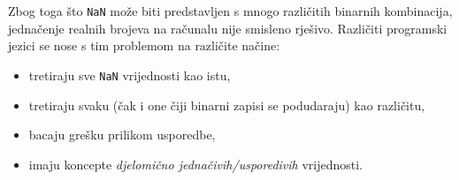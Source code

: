 Zbog toga što \verb|NaN| može biti predstavljen s mnogo različitih binarnih kombinacija, jednačenje realnih brojeva na računalu nije smisleno rješivo. Različiti programski jezici se nose s tim problemom na različite načine:

\begin{itemize}
    \item tretiraju sve \verb|NaN| vrijednosti kao istu,
    \item tretiraju svaku (čak i one čiji binarni zapisi se podudaraju) kao različitu,
    \item bacaju grešku prilikom usporedbe,
    \item imaju koncepte \textit{djelomično jednačivih/usporedivih} vrijednosti.
\end{itemize}
